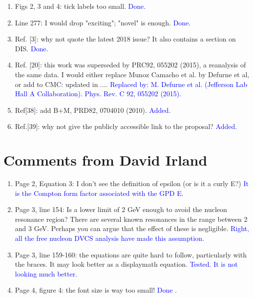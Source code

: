 \documentclass[a4paper,11pt,twoside]{article}
\begin{document}
\begin{enumerate}
   \item Figs 2, 3 and 4: tick labels too small.
\textcolor{blue}{Done.}

   \item Line 277: I would drop "exciting"; "novel" is enough.
\textcolor{blue}{Done.}

   \item Ref. [3]: why not quote the latest 2018 issue? It also contains a 
      section on DIS.
\textcolor{blue}{Done.}

   \item Ref. [20]: this work was superseded by PRC92, 055202 (2015), a 
      reanalysis of the same data. I would either replace Munoz Camacho et al.  
      by Defurne et al, or add to CMC: updated in ....
      \textcolor{blue}{Replaced by: M. Defurne et al. (Jefferson Lab Hall A 
      Collaboration). Phys. Rev. C 92, 055202 (2015).}

   \item Ref[38]: add B+M, PRD82, 0704010 (2010).
\textcolor{blue}{Added.}

   \item Ref.[39]: why not give the publicly accessible link to the proposal?
   \textcolor{blue}{Added.}
  
\end{enumerate}



\section{Comments from David Irland}


\begin{enumerate}

\item Page 2, Equation 3: I don't see the definition of epsilon (or is it a 
   curly E?)
\textcolor{blue}{It is the Compton form factor associated with the GPD E.}

\item Page 3, line 154: Is a lower limit of 2 GeV enough to avoid the nucleon 
   resonance region? There are several known resonances in the range between 2 
      and 3 GeV. Perhaps you can argue that the effect of these is negligible.
\textcolor{blue}{Right, all the free nucleon DVCS analysis have made this 
      assumption.}

\item Page 3, line 159-160: the equations are quite hard to follow, 
   particularly with the braces. It may look better as a displaymath equation.
\textcolor{blue}{Tested. It is not looking much better.}

\item Page 4, figure 4: the font size is way too small!  \textcolor{blue}{Done
   .}
  
\end{enumerate}
\end{document}
